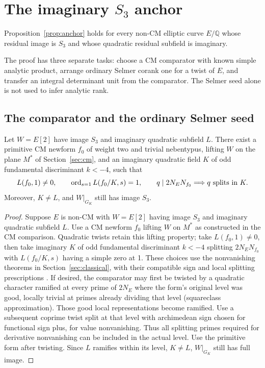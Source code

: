 \section{The imaginary \texorpdfstring{\(S_3\)}{S3} anchor}\label{alternation-imaginary:anchor-section}

\begin{proposition}\label{alternation-imaginary:anchor}
Proposition~\ref{prop:anchor} holds for every non-CM elliptic curve \(E/\mathbb Q\) whose residual image is \(S_3\) and whose quadratic residual subfield is imaginary.
\end{proposition}

The proof has three separate tasks: choose a CM comparator with known simple analytic product, arrange ordinary Selmer corank one for a twist of \(E\), and transfer an integral determinant unit from the comparator. The Selmer seed alone is not used to infer analytic rank.

\subsection{The comparator and the ordinary Selmer seed}

\begin{lemma}\label{alternation-imaginary:comparator}
Let \(W=E[2]\) have image \(S_3\) and imaginary quadratic subfield \(L\). There exist a primitive CM newform \(f_0\) of weight two and trivial nebentypus, lifting \(W\) on the plane \(M^*\) of Section~\ref{sec:cm}, and an imaginary quadratic field \(K\) of odd fundamental discriminant \(k<-4\), such that
\[
 L(f_0,1)\ne0,\qquad \operatorname{ord}_{s=1}L(f_0/K,s)=1,
 \qquad q\mid 2N_E N_{f_0}\Longrightarrow q\text{ splits in }K.
\]
Moreover, \(K\ne L\), and \(W|_{G_K}\) still has image \(S_3\).
\end{lemma}
\begin{proof}

Suppose \(E\) is non-CM with \(W=E[2]\) having image \(S_3\) and imaginary quadratic subfield \(L\). Use a CM newform \(f_0\) lifting \(W\) on \(M^*\) as constructed in the CM comparison. Quadratic twists retain this lifting property; take \(L(f_0,1)\ne0\), then take imaginary \(K\) of odd fundamental discriminant \(k<-4\) splitting \(2N_E N_{f_0}\) with \(L(f_0/K,s)\) having a simple zero at 1. These choices use the nonvanishing theorems in Section~\ref{sec:classical}, with their compatible sign and local splitting prescriptions \cite{FH95,BFH90}. If desired, the comparator may first be twisted by a quadratic character ramified at every prime of \(2N_E\) where the form's original level was good, locally trivial at primes already dividing that level (squareclass approximation). Those good local representations become ramified. Use a subsequent coprime twist split at that level with archimedean sign chosen for functional sign plus, for value nonvanishing. Thus all splitting primes required for derivative nonvanishing can be included in the actual level. Use the primitive form after twisting. Since \(L\) ramifies within its level, \(K\ne L\), \(W|_{G_K}\) still has full image.

\end{proof}


